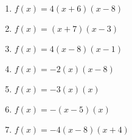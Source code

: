 \documentclass{article}%
\begin{document}
\begin{enumerate}[label=\alph*)]
\item%
\newline\vspace{0.5cm} $f(x)=4(x+6)(x-8)$%
\item%
\newline\vspace{0.5cm} $f(x)=(x+7)(x-3)$%
\item%
\newline\vspace{0.5cm} $f(x)=4(x-8)(x-1)$%
\item%
\newline\vspace{0.5cm} $f(x)=-2(x)(x-8)$%
\item%
\newline\vspace{0.5cm} $f(x)=-3(x)(x)$%
\item%
\newline\vspace{0.5cm} $f(x)=-(x-5)(x)$%
\item%
\newline\vspace{0.5cm} $f(x)=-4(x-8)(x+4)$%
\end{enumerate}

%
\end{document}
